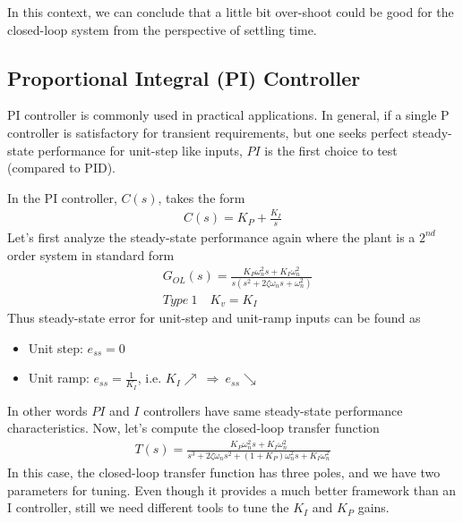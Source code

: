 \documentclass[twoside]{article}
\begin{document}
In this context, we can conclude that
a little bit over-shoot could be good for the closed-loop
system from the perspective of settling time. 

\subsection{Proportional Integral (PI) Controller}

PI controller is commonly used in practical applications. 
In general, if a single P controller is satisfactory for 
transient requirements, but one seeks perfect steady-state
performance for unit-step like inputs, $PI$ is the first choice to
test (compared to PID). 

In the PI controller, $C(s)$, takes the form
%
\begin{align*}
 C(s) = K_P + \frac{K_I}{s}
\end{align*}
%
Let's first analyze the steady-state 
performance again where the plant is a $2^{nd}$ order system in standard form
%
\begin{align*}
  &G_{OL}(s) = \frac{K_P \omega_n^2 s +  K_I \omega_n^2}{s (s^2 + 2 \zeta
    \omega_n s + \omega_n^2)}
\\
 &Type \ 1 \quad K_v = K_I
\end{align*}
% 
Thus steady-state error for unit-step and unit-ramp inputs can be found
as
\begin{itemize}
\item Unit step: $e_{ss} = 0$ 
\item Unit ramp: $e_{ss} = \frac{1}{K_I}$, i.e. $K_I \nearrow \ \Rightarrow \ e_{ss} \searrow$  
\end{itemize}
In other words $PI$ and $I$ controllers have same steady-state
performance characteristics. Now, let's compute the closed-loop transfer function
%
\begin{align*}
T(s) = \frac{K_P \omega_n^2 s + K_I \omega_n^2}{s^3 + 2 \zeta \omega_n
  s^2 + (1 + K_P) \omega_n^2 s
  + K_I \omega_n^2}
\end{align*}
In this case, the closed-loop transfer function has three poles, 
and we have two parameters for tuning. Even though it provides a
much better framework than an I controller, still we need different tools
to tune the $K_I$ and $K_P$ gains.
\end{document}
